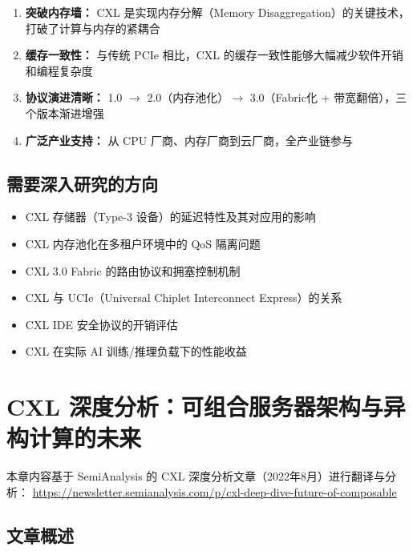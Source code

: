 \documentclass[12pt,a4paper]{article}
\begin{document}
\begin{enumerate}[label=(\arabic*)]
    \item \textbf{突破内存墙：} CXL 是实现内存分解（Memory Disaggregation）的关键技术，打破了计算与内存的紧耦合
    \item \textbf{缓存一致性：} 与传统 PCIe 相比，CXL 的缓存一致性能够大幅减少软件开销和编程复杂度
    \item \textbf{协议演进清晰：} 1.0 $\rightarrow$ 2.0（内存池化）$\rightarrow$ 3.0（Fabric化 + 带宽翻倍），三个版本渐进增强
    \item \textbf{广泛产业支持：} 从 CPU 厂商、内存厂商到云厂商，全产业链参与
\end{enumerate}

\subsection{需要深入研究的方向}

\begin{itemize}
    \item CXL 存储器（Type-3 设备）的延迟特性及其对应用的影响
    \item CXL 内存池化在多租户环境中的 QoS 隔离问题
    \item CXL 3.0 Fabric 的路由协议和拥塞控制机制
    \item CXL 与 UCIe（Universal Chiplet Interconnect Express）的关系
    \item CXL IDE 安全协议的开销评估
    \item CXL 在实际 AI 训练/推理负载下的性能收益
\end{itemize}

\section{CXL 深度分析：可组合服务器架构与异构计算的未来}

\begin{tcolorbox}[title=来源]
本章内容基于 SemiAnalysis 的 CXL 深度分析文章（2022年8月）进行翻译与分析：\newline
\url{https://newsletter.semianalysis.com/p/cxl-deep-dive-future-of-composable}
\end{tcolorbox}

\subsection{文章概述}
\end{document}
